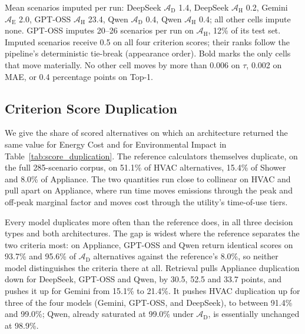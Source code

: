 \documentclass[11pt]{article}
\begin{document}
Mean scenarios imputed per run: DeepSeek $\mathcal{A}_{\text{D}}$ 1.4, DeepSeek $\mathcal{A}_{\text{H}}$ 0.2, Gemini $\mathcal{A}_{\text{E}}$ 2.0, GPT-OSS $\mathcal{A}_{\text{H}}$ 23.4, Qwen $\mathcal{A}_{\text{D}}$ 0.4, Qwen $\mathcal{A}_{\text{H}}$ 0.4; all other cells impute none. GPT-OSS imputes 20--26 scenarios per run on $\mathcal{A}_{\text{H}}$, 12\% of its test set. Imputed scenarios receive 0.5 on all four criterion scores; their ranks follow the pipeline's deterministic tie-break (appearance order). Bold marks the only cells that move materially. No other cell moves by more than 0.006 on $\tau$, 0.002 on MAE, or 0.4 percentage points on Top-1.

\subsection{Criterion Score Duplication}
\label{app:score_duplication}

We give the share of scored alternatives on which an architecture returned the same value for Energy Cost and for Environmental Impact in Table~\ref{tab:score_duplication}. The reference calculators themselves duplicate, on the full 285-scenario corpus, on 51.1\% of HVAC alternatives, 15.4\% of Shower and 8.0\% of Appliance. The two quantities run close to collinear on HVAC and pull apart on Appliance, where run time moves emissions through the peak and off-peak marginal factor and moves cost through the utility's time-of-use tiers.

Every model duplicates more often than the reference does, in all three decision types and both architectures. The gap is widest where the reference separates the two criteria most: on Appliance, GPT-OSS and Qwen return identical scores on 93.7\% and 95.6\% of $\mathcal{A}_{\text{D}}$ alternatives against the reference's 8.0\%, so neither model distinguishes the criteria there at all. Retrieval pulls Appliance duplication down for DeepSeek, GPT-OSS and Qwen, by 30.5, 52.5 and 33.7 points, and pushes it up for Gemini from 15.1\% to 21.4\%. It pushes HVAC duplication up for three of the four models (Gemini, GPT-OSS, and DeepSeek), to between 91.4\% and 99.0\%; Qwen, already saturated at 99.0\% under $\mathcal{A}_{\text{D}}$, is essentially unchanged at 98.9\%.
\end{document}
